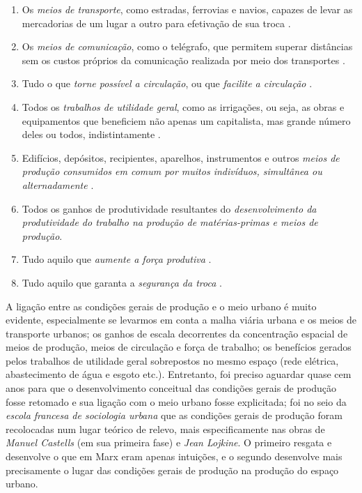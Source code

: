 \begin{enumerate}
\item Os \textit{meios de transporte}, como estradas, ferrovias e navios, capazes de levar as mercadorias de um lugar a outro para efetivação de sua troca \cite[p.~522]{MARX2013}.
\item Os \textit{meios de comunicação}, como o telégrafo, que permitem superar distâncias sem os custos próprios da comunicação realizada por meio dos transportes \cite[p.~457-458]{MARX2013}.
\item Tudo o que \textit{torne possível a circulação}, ou que \textit{facilite a circulação} \cite[p.~438]{MARX2011}.
\item Todos os \textit{trabalhos de utilidade geral}, como as irrigações, ou seja, as obras e equipamentos que beneficiem não apenas um capitalista, mas grande número deles ou todos, indistintamente \cite[p.~438]{MARX2011}.
\item Edifícios, depósitos, recipientes, aparelhos, instrumentos e outros \textit{meios de produção consumidos em comum por muitos indivíduos, simultânea ou alternadamente} \cite[p.~399-400]{MARX2013}.
\item Todos os ganhos de produtividade resultantes do \textit{desenvolvimento da produtividade do trabalho na produção de matérias-primas e meios de produção}.
\item Tudo aquilo que \textit{aumente a força produtiva} \cite[p.~114]{MARX2008}.
\item Tudo aquilo que garanta a \textit{segurança da troca} \cite[p.~432-433]{MARX2011}.
\end{enumerate}

A ligação entre as condições gerais de produção e o meio urbano é muito evidente, especialmente se levarmos em conta a malha viária urbana e os meios de transporte urbanos; os ganhos de escala decorrentes da concentração espacial de meios de produção, meios de circulação e força de trabalho; os benefícios gerados pelos trabalhos de utilidade geral sobrepostos no mesmo espaço (rede elétrica, abastecimento de água e esgoto etc.). Entretanto, foi preciso aguardar quase cem anos para que o desenvolvimento conceitual das condições gerais de produção fosse retomado e sua ligação com o meio urbano fosse explicitada; foi no seio da \textit{escola francesa de sociologia urbana} que as condições gerais de produção foram recolocadas num lugar teórico de relevo, mais especificamente nas obras de \textit{Manuel Castells} (em sua primeira fase) e \textit{Jean Lojkine}. O primeiro resgata e desenvolve o que em Marx eram apenas intuições, e o segundo desenvolve mais precisamente o lugar das condições gerais de produção na produção do espaço urbano.


